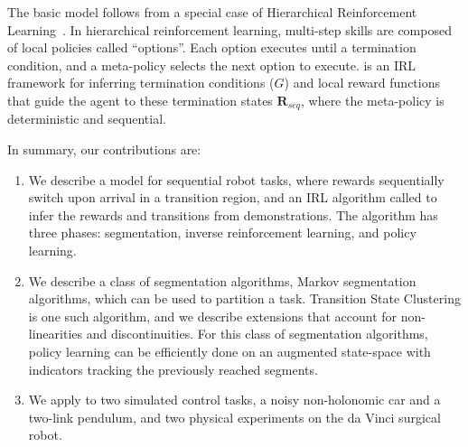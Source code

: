 The basic model follows from a special case of Hierarchical Reinforcement Learning~\citep{suttonPS99}.
In hierarchical reinforcement learning, multi-step skills are composed of local policies called ``options''. Each option executes until a termination condition, and a meta-policy selects the next option to execute.
\hirl is an IRL framework for inferring termination conditions ($G$) and local reward functions that guide the agent to these termination states $\mathbf{R}_{seq}$, where the meta-policy is deterministic and sequential.


In summary, our contributions are:
\begin{enumerate}
\item We describe a model for sequential robot tasks, where rewards sequentially switch upon arrival in a transition region, and an IRL algorithm called \hirlfull to infer the rewards and transitions from demonstrations. The algorithm has three phases: segmentation, inverse reinforcement learning, and policy learning.
\item We describe a class of segmentation algorithms, Markov segmentation algorithms, which can be used to partition a task. Transition State Clustering is one such algorithm, and we describe extensions that account for non-linearities and discontinuities. For this class of segmentation algorithms, policy learning can be efficiently done on an augmented state-space with indicators tracking the previously reached segments.
\item We apply \hirl to two simulated control tasks, a noisy non-holonomic car and a two-link pendulum, and two physical experiments on the da Vinci surgical robot.
\end{enumerate}


